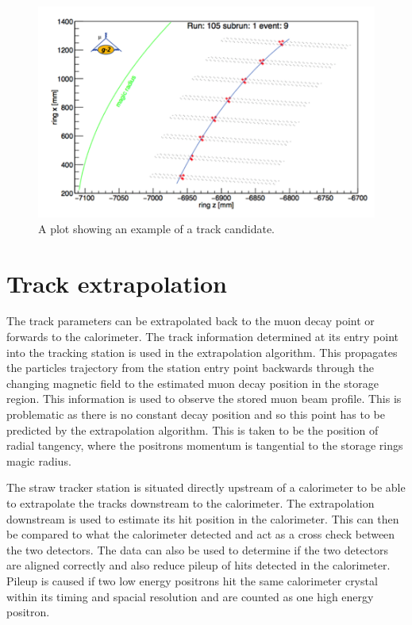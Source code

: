 \begin{figure}[th]
\centering
\includegraphics[scale=1.4]{Figures/Track.png}
\decoRule
\caption{A plot showing an example of a track candidate.}
\label{fig:Track}
\end{figure}

\section{Track extrapolation}

The track parameters can be extrapolated back to the muon decay point or forwards to the calorimeter. The track information determined at its entry point into the tracking station is used in the extrapolation algorithm. This propagates the particles trajectory from the station entry point backwards through the changing magnetic field to the estimated muon decay position in the storage region. This information is used to observe the stored muon beam profile. This is problematic as there is no constant decay position and so this point has to be predicted by the extrapolation algorithm. This is taken to be the position of radial tangency, where the positrons momentum is tangential to the storage rings magic radius. 

The straw tracker station is situated directly upstream of a calorimeter to be able to extrapolate the tracks downstream to the calorimeter. The extrapolation downstream is used to estimate its hit position in the calorimeter. This can then be compared to what the calorimeter detected and act as a cross check between the two detectors. The data can also be used to determine if the two detectors are aligned correctly and also reduce pileup of hits detected in the calorimeter. Pileup is caused if two low energy positrons hit the same calorimeter crystal within its timing and spacial resolution and are counted as one high energy positron.

